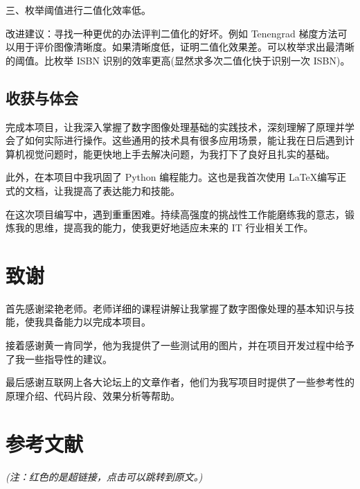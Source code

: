 \documentclass{ctexart}
\begin{document}
三、枚举阈值进行二值化效率低。

改进建议：寻找一种更优的办法评判二值化的好坏。例如 Tenengrad 梯度方法可以用于评价图像清晰度。如果清晰度低，证明二值化效果差。可以枚举求出最清晰的阈值。比枚举 ISBN 识别的效率更高(显然求多次二值化快于识别一次 ISBN)。

\subsection{收获与体会}
完成本项目，让我深入掌握了数字图像处理基础的实践技术，深刻理解了原理并学会了如何实际进行操作。这些通用的技术具有很多应用场景，能让我在日后遇到计算机视觉问题时，能更快地上手去解决问题，为我打下了良好且扎实的基础。

此外，在本项目中我巩固了 Python 编程能力。这也是我首次使用 \LaTeX 编写正式的文档，让我提高了表达能力和技能。

在这次项目编写中，遇到重重困难。持续高强度的挑战性工作能磨练我的意志，锻炼我的思维，提高我的能力，使我更好地适应未来的 IT 行业相关工作。

\section{致谢}
首先感谢梁艳老师。老师详细的课程讲解让我掌握了数字图像处理的基本知识与技能，使我具备能力以完成本项目。

接着感谢黄一肯同学，他为我提供了一些测试用的图片，并在项目开发过程中给予了我一些指导性的建议。

最后感谢互联网上各大论坛上的文章作者，他们为我写项目时提供了一些参考性的原理介绍、代码片段、效果分析等帮助。

\section{参考文献}


\textit{(注：红色的是超链接，点击可以跳转到原文。)}
\end{document}

